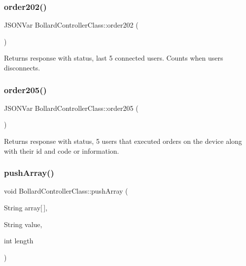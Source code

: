 \subsubsection{\texorpdfstring{order202()}{order202()}}
{\footnotesize\ttfamily J\+S\+O\+N\+Var Bollard\+Controller\+Class\+::order202 (\begin{DoxyParamCaption}{ }\end{DoxyParamCaption})\hspace{0.3cm}{\ttfamily [private]}}

Returns response with status, last 5 connected users. Counts when users disconnects. \mbox{\label{class_bollard_controller_class_a691390c11d2573946b99240d088c647e}} 
\subsubsection{\texorpdfstring{order205()}{order205()}}
{\footnotesize\ttfamily J\+S\+O\+N\+Var Bollard\+Controller\+Class\+::order205 (\begin{DoxyParamCaption}{ }\end{DoxyParamCaption})\hspace{0.3cm}{\ttfamily [private]}}

Returns response with status, 5 users that executed orders on the device along with their id and code or information. \mbox{\label{class_bollard_controller_class_a20ba08d7a3efdadd4a70b7fcd03644d3}} 
\subsubsection{\texorpdfstring{push\+Array()}{pushArray()}}
{\footnotesize\ttfamily void Bollard\+Controller\+Class\+::push\+Array (\begin{DoxyParamCaption}\item[{String}]{array\mbox{[}$\,$\mbox{]},  }\item[{String}]{value,  }\item[{int}]{length }\end{DoxyParamCaption})\hspace{0.3cm}{\ttfamily [private]}}


